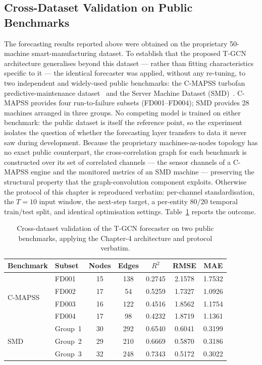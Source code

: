 \subsection{Cross-Dataset Validation on Public Benchmarks}
The forecasting results reported above were obtained on the proprietary
50-machine smart-manufacturing dataset. To establish that the proposed T-GCN
architecture generalises beyond this dataset --- rather than fitting
characteristics specific to it --- the identical forecaster was applied,
without any re-tuning, to two independent and widely-used public benchmarks:
the C-MAPSS turbofan predictive-maintenance dataset~\cite{saxena_damage_2008}
and the Server Machine Dataset (SMD)~\cite{su_robust_2019}. C-MAPSS provides
four run-to-failure subsets (FD001--FD004); SMD provides 28 machines arranged
in three groups. No competing model is trained on either benchmark: the public
dataset is itself the reference point, so the experiment isolates the question
of whether the forecasting layer transfers to data it never saw during
development. Because the proprietary machines-as-nodes topology has no exact
public counterpart, the cross-correlation graph for each benchmark is
constructed over its set of correlated channels --- the sensor channels of a
C-MAPSS engine and the monitored metrics of an SMD machine --- preserving the
structural property that the graph-convolution component exploits. Otherwise
the protocol of this chapter is reproduced verbatim: per-channel
standardisation, the $T = 10$ input window, the next-step target, a per-entity
80/20 temporal train/test split, and identical optimisation settings.
Table~\ref{tab:tgcn_crossdataset} reports the outcome.

\begin{table}[!htbp]
\centering
\caption{Cross-dataset validation of the T-GCN forecaster on two public benchmarks, applying the Chapter-4 architecture and protocol verbatim.}
\label{tab:tgcn_crossdataset}
\small
\renewcommand{\arraystretch}{1.2}
\begin{tabular}{llccccc}
\toprule
\textbf{Benchmark} & \textbf{Subset} & \textbf{Nodes} & \textbf{Edges} & $R^2$ & RMSE & MAE \\
\midrule
\multirow{4}{*}{C-MAPSS~\cite{saxena_damage_2008}}
  & FD001 & 15 & 138 & 0.2745 & 2.1578 & 1.7532 \\
  & FD002 & 17 & 54  & 0.5259 & 1.7327 & 1.0926 \\
  & FD003 & 16 & 122 & 0.4516 & 1.8562 & 1.1754 \\
  & FD004 & 17 & 98  & 0.4232 & 1.8719 & 1.1361 \\
\midrule
\multirow{3}{*}{SMD~\cite{su_robust_2019}}
  & Group~1 & 30 & 292 & 0.6540 & 0.6041 & 0.3199 \\
  & Group~2 & 29 & 210 & 0.6669 & 0.5870 & 0.3186 \\
  & Group~3 & 32 & 248 & 0.7343 & 0.5172 & 0.3022 \\
\bottomrule
\end{tabular}
\end{table}

